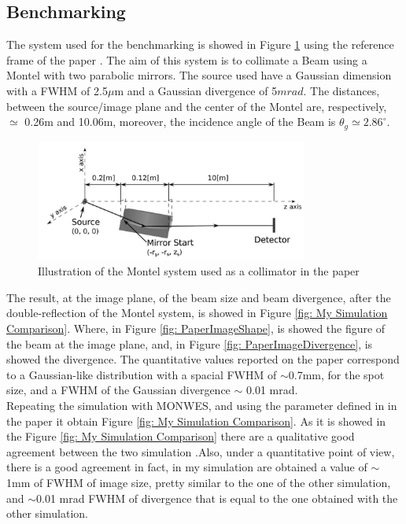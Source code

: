 \subsection{Benchmarking} 
The system used for the benchmarking is showed in Figure \ref{fig: PaperMontelSystem} using the reference frame of the paper \cite{resta2015nested}. The aim of this system is to collimate a Beam using a Montel with two parabolic mirrors. The source used have a Gaussian dimension with a FWHM of 2.5$\mu $m and a Gaussian divergence of 5$mrad $. The distances, between the source/image plane and the center of the Montel are, respectively,  $\simeq $ 0.26m and 10.06m, moreover, the incidence angle of the Beam is $\theta_g \simeq 2.86^{\circ} $.
%
\begin{figure}[]
	\centering
		\includegraphics[width=0.8\textwidth]{Immagini/Chapter4/PaperMontelSystem}
		\caption{Illustration of the Montel system used as a collimator in the paper \cite{resta2015nested}}
		\label{fig: PaperMontelSystem}
\end{figure}
%
The result, at the image plane, of the beam size and beam divergence, after the double-reflection of the Montel system, is showed in Figure \ref{fig: My Simulation Comparison}. Where, in Figure \ref{fig: PaperImageShape}, is showed the figure of the beam at the image plane, and, in Figure \ref{fig: PaperImageDivergence}, is showed the divergence. The quantitative values reported on the paper correspond to a Gaussian-like distribution with a spacial FWHM of $\sim $0.7mm, for the spot size, and a FWHM of the Gaussian divergence $\sim $ 0.01 mrad.
\\
Repeating the simulation with MONWES, and using the parameter defined in  in the paper \cite{resta2015nested} it obtain Figure \ref{fig: My Simulation Comparison}. As it is showed in the Figure \ref{fig: My Simulation Comparison} there are a qualitative good agreement between the two simulation .Also, under a quantitative point of view, there is a good agreement in fact, in my simulation are obtained a value of $\sim $1mm of FWHM of image size, pretty similar to the one of the other simulation, and $\sim $0.01 mrad FWHM of divergence that is equal to the one obtained with the other simulation.
